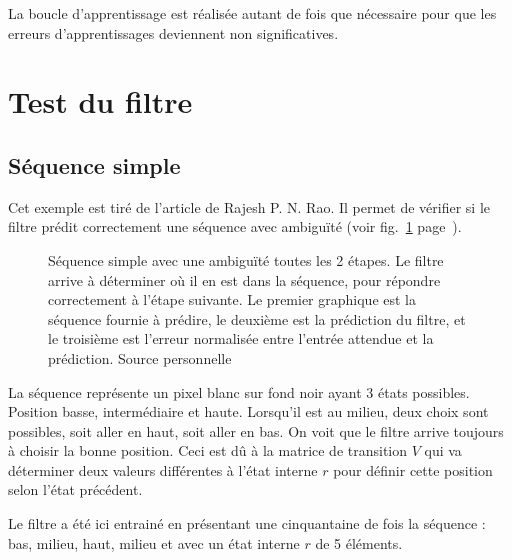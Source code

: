 La boucle d'apprentissage est réalisée autant de fois que nécessaire pour que
les erreurs d'apprentissages deviennent non significatives.



\section{Test du filtre} %
\label{sec:Test du filtre}

\subsection{Séquence simple} %
\label{sub:Sequence simple}

Cet exemple est tiré de l'article de Rajesh P. N. Rao. Il permet de vérifier si
le filtre prédit correctement une séquence avec ambiguïté (voir
fig.~\ref{fig:sequence_simple} page~\pageref{fig:sequence_simple}).

\begin{figure}[ht]
   \begin{center}
   \end{center}
   \caption[Prédiction de séquence simple]{Séquence simple avec une ambiguïté
   toutes les 2 étapes. Le filtre arrive à déterminer où il en est dans la
   séquence, pour répondre correctement à l'étape suivante. Le premier graphique est
   la séquence fournie à prédire, le deuxième est la prédiction du filtre, et le
   troisième est l'erreur normalisée entre l'entrée attendue et la prédiction.
   Source personnelle}
   \label{fig:sequence_simple}
\end{figure}

La séquence représente un pixel blanc sur fond noir ayant 3 états possibles.
Position basse, intermédiaire et haute. Lorsqu'il est au milieu, deux choix sont
possibles, soit aller en haut, soit aller en bas. On voit que le filtre arrive
toujours à choisir la bonne position. Ceci est dû à la matrice de transition
$V$ qui va déterminer deux valeurs différentes à l'état interne $r$ pour définir
cette position selon l'état précédent\cite{Rao1999}.

Le filtre a été ici entrainé en présentant une cinquantaine de fois la séquence :
bas, milieu, haut, milieu et avec un état interne $r$ de 5 éléments.


